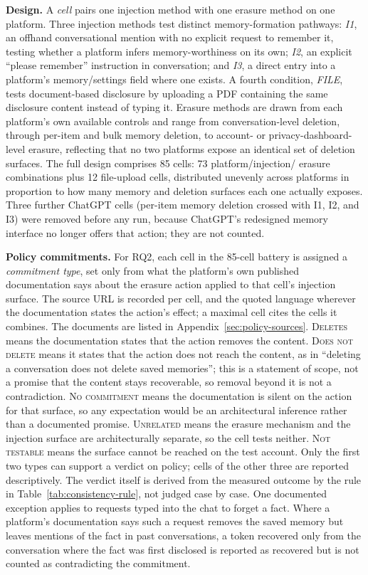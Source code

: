 \documentclass[conference,compsoc]{IEEEtran}
\begin{document}
\textbf{Design.} A \textit{cell} pairs one injection method with one
erasure method on one platform. Three injection methods test distinct
memory-formation pathways: \textit{I1}, an offhand conversational mention
with no explicit request to remember it, testing whether a platform
infers memory-worthiness on its own; \textit{I2}, an explicit
``please remember'' instruction in conversation; and \textit{I3}, a
direct entry into a platform's memory/settings field where one exists. A
fourth condition, \textit{FILE}, tests document-based disclosure by
uploading a PDF containing the same disclosure content instead of typing
it. Erasure methods are drawn from each platform's own available
controls and range from conversation-level deletion, through per-item and
bulk memory deletion, to account- or privacy-dashboard-level erasure,
reflecting that no two platforms expose an identical set of deletion
surfaces. The full design comprises 85 cells: 73 platform/injection/
erasure combinations plus 12 file-upload cells, distributed unevenly
across platforms in proportion to how many memory and deletion surfaces
each one actually exposes. Three further ChatGPT cells (per-item memory
deletion crossed with I1, I2, and I3) were removed before any run, because
ChatGPT's redesigned memory interface no longer offers that action; they
are not counted.

\textbf{Policy commitments.} For RQ2, each cell in the 85-cell battery is
assigned a \textit{commitment type}, set only from what the platform's own
published documentation says about the erasure action applied to that
cell's injection surface. The source URL is recorded per cell, and the
quoted language wherever the documentation states the action's effect; a
maximal cell cites the cells it combines. The documents are listed in Appendix~\ref{sec:policy-sources}. \textsc{Deletes} means the documentation states that
the action removes the content. \textsc{Does not delete} means it states
that the action does not reach the content, as in ``deleting a
conversation does not delete saved memories''; this is a statement of
scope, not a promise that the content stays recoverable, so removal
beyond it is not a contradiction. \textsc{No commitment} means the
documentation is silent on the action for that surface, so any expectation
would be an architectural inference rather than a documented promise.
\textsc{Unrelated} means the erasure mechanism and the injection surface
are architecturally separate, so the cell tests neither.
\textsc{Not testable} means the surface cannot be reached on the test
account. Only the first two types can support a verdict on policy; cells
of the other three are reported descriptively. The verdict itself is
derived from the measured outcome by the rule in
Table~\ref{tab:consistency-rule}, not judged case by case. One documented
exception applies to requests typed into the chat to forget a fact. Where
a platform's documentation says such a request removes the saved memory but
leaves mentions of the fact in past conversations, a token recovered only
from the conversation where the fact was first disclosed is reported as
recovered but is not counted as contradicting the commitment.
\end{document}
